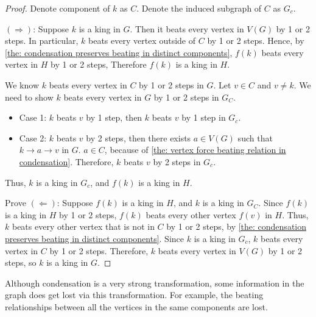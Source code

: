 \begin{proof}
  Denote component of \(k\) as \(C\).
  Denote the induced subgraph of \(C\) as \(G_c\).

  \((\Rightarrow )\):
  Suppose \(k\) is a king in \(G\). Then it beats every vertex in \(V(G)\)
  by 1 or 2 steps.
  In particular, \(k\) beats every vertex outside of \(C\) by
  1 or 2 steps.
  Hence, by \cref{the: condensation preserves beating in distinct components},
  \(f(k)\) beats every vertex in \(H\) by 1 or 2 steps,
  Therefore \(f(k)\) is a king in \(H\).

  We know \(k\) beats every vertex in \(C\) by 1 or 2 steps in \(G\).
  Let \(v \in C\) and \(v \neq k\).
  We need to show \(k\) beats every vertex in \(G\) by 1 or 2 steps in \(G_C\).
  \begin{itemize}
    \item Case 1: \(k\) beats \(v\) by 1 step, then
      \(k\) beats \(v\) by 1 step in \(G_c\).
    \item Case 2: \(k\) beats \(v\) by 2 steps, then
      there exists \(a \in V(G)\) such that \(k \to a \to v\) in \(G\).
      \(a \in C\), because of
      \cref{the: vertex force beating relation in condensation}.
      Therefore, \(k\) beats \(v\) by 2 steps in \(G_c\).
  \end{itemize}
  Thus, \(k\) is a king in \(G_c\),
  and \(f(k)\) is a king in \(H\).

  Prove \((\Leftarrow )\):
  Suppose \(f(k)\) is a king in \(H\),
  and \(k\) is a king in \(G_C\).
  Since \(f(k)\) is a king in \(H\) by 1 or 2 steps,
  \(f(k)\) beats every other vertex \(f(v)\) in \(H\).
  Thus, \(k\) beats every other vertex that is not in \(C\)
  by 1 or 2 steps, by \cref{the: condensation preserves beating in distinct components}.
  Since \(k\) is a king in \(G_c\),
  \(k\) beats every vertex in \(C\) by 1 or 2 steps.
  Therefore, \(k\) beats every vertex in \(V(G)\) by 1 or 2 steps,
  so \(k\) is a king in \(G\).
\end{proof}

Although condensation is a very strong transformation,
some information in the graph does get lost via this transformation.
For example, the beating relationships between all the vertices
in the same components are lost.



